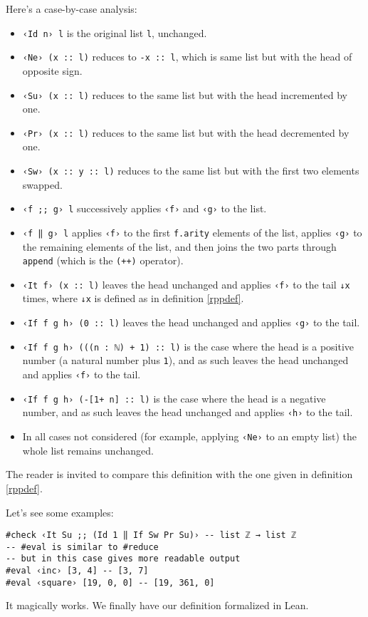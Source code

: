 \documentclass{book}
\theoremstyle{definition}
\theoremstyle{remark}
\theoremstyle{plain}
\begin{document}
Here's a case-by-case analysis:
\begin{itemize}
\item \lstinline{‹Id n› l} is the original list \lstinline{l}, unchanged.
\item \lstinline{‹Ne› (x :: l)} reduces to \lstinline{-x :: l}, which is same list but with the head of opposite sign.
\item \lstinline{‹Su› (x :: l)} reduces to the same list but with the head incremented by one.
\item \lstinline{‹Pr› (x :: l)} reduces to the same list but with the head decremented by one.
\item \lstinline{‹Sw› (x :: y :: l)} reduces to the same list but with the first two elements swapped.
\item \lstinline{‹f ;; g› l} successively applies \lstinline{‹f›} and \lstinline{‹g›} to the list.
\item \lstinline{‹f ‖ g› l} applies \lstinline{‹f›} to the first \lstinline{f.arity} elements of the list,
applies \lstinline{‹g›} to the remaining elements of the list,
and then joins the two parts through \lstinline{append} (which is the \lstinline{(++)} operator).
\item \lstinline{‹It f› (x :: l)} leaves the head unchanged and applies \lstinline{‹f›} to the tail \lstinline{↓x} times,
where \lstinline{↓x} is defined as in definition \ref{rppdef}.
\item \lstinline{‹If f g h› (0 :: l)} leaves the head unchanged and applies \lstinline{‹g›} to the tail.
\item \lstinline{‹If f g h› (((n : ℕ) + 1) :: l)} is the case where the head is a positive number
(a natural number plus \lstinline{1}),
and as such leaves the head unchanged and applies \lstinline{‹f›} to the tail.
\item \lstinline{‹If f g h› (-[1+ n] :: l)} is the case where the head is a negative number,
and as such leaves the head unchanged and applies \lstinline{‹h›} to the tail.
\item In all cases not considered (for example, applying \lstinline{‹Ne›} to an empty list) the whole list remains unchanged. 
\end{itemize}

The reader is invited to compare this definition with the one given in definition \ref{rppdef}.

Let's see some examples:
\begin{lstlisting}
#check ‹It Su ;; (Id 1 ‖ If Sw Pr Su)› -- list ℤ → list ℤ
-- #eval is similar to #reduce
-- but in this case gives more readable output
#eval ‹inc› [3, 4] -- [3, 7]
#eval ‹square› [19, 0, 0] -- [19, 361, 0]
\end{lstlisting}
It magically works. We finally have our definition formalized in Lean.
\end{document}

